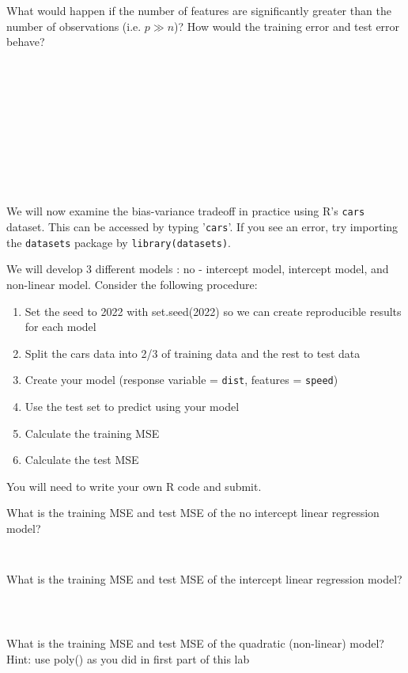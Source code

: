 \documentclass{article}
\begin{document}
What would happen if the number of features are significantly greater than the
number of observations (i.e. $p \gg n$)? How would the training error and test
error behave?

\begin{Verbatim}[frame=single]











\end{Verbatim}

We will now examine the bias-variance tradeoff in practice using R's
\texttt{cars} dataset.
This can be accessed by typing '\texttt{cars}'. If you see an error, try
importing the \texttt{datasets} package by \texttt{library(datasets)}.

We will develop 3 different models : no - intercept model, intercept model, and
non-linear model. Consider the following procedure:
\begin{enumerate}
	\item Set the seed to 2022 with set.seed(2022) so we can create reproducible results
	for each model
	\item Split the cars data into 2/3 of training data and the rest to test
	data
	\item Create your model (response variable = \texttt{dist}, features =
	\texttt{speed})
	\item Use the test set to predict using your model
	\item Calculate the training MSE
	\item Calculate the test MSE
\end{enumerate}
You will need to write your own R code and submit.

What is the training MSE and test MSE of the no intercept linear regression
model?
\begin{Verbatim}[frame=single]


\end{Verbatim}

What is the training MSE and test MSE of the intercept linear regression model?
\begin{Verbatim}[frame=single]



\end{Verbatim}

What is the training MSE and test MSE of the quadratic (non-linear) model?\\
Hint: use poly() as you did in first part of this lab\\
\end{document}

